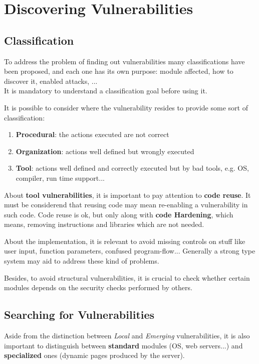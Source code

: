 \chapter{Discovering Vulnerabilities}
\section{Classification}
To address the problem of finding out vulnerabilities many classifications have been proposed,
and each one has its own purpose: module affected, how to discover it, enabled attacks, ...\\
It is mandatory to understand a classification goal before using it.

It is possible to consider where the vulnerability resides to provide some sort of classification:
\begin{enumerate}
    \item \textbf{Procedural}: the actions executed are not correct
    \item \textbf{Organization}: actions well defined but wrongly executed
    \item \textbf{Tool}: actions well defined and correctly executed but by bad tools, e.g. OS, compiler, run time support...
\end{enumerate}

About \textbf{tool vulnerabilities}, it is important to pay attention to \textbf{code reuse}.
It must be considerend that reusing code may mean re-enabling a vulnerability in such code.
Code reuse is ok, but only along with \textbf{code Hardening}, which means, removing instructions and libraries which are not needed.

About the implementation, it is relevant to avoid missing controls on stuff like user input, function parameters, confused program-flow...
Generally a strong type system may aid to address these kind of problems.

Besides, to avoid structural vulnerabilities, it is crucial to check whether certain modules depends on the security checks performed by others.

\section*{Searching for Vulnerabilities}
Aside from the distinction between \textit{Local} and \textit{Emerging} vulnerabilities, it is also important to distinguish between \textbf{standard} modules (OS, web servers...) and \textbf{specialized} ones (dynamic pages produced by the server).

